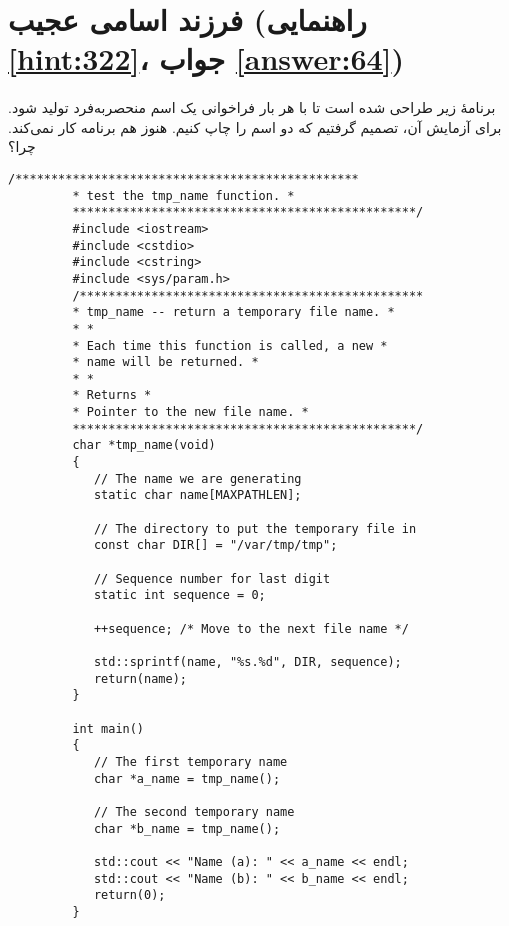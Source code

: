 \section[فرزند اسامی عجیب]{فرزند اسامی عجیب \protect{} (راهنمایی \ref{hint:322}، جواب \ref{answer:64})}
\paragraph{}\label{prog:59}
برنامهٔ زیر طراحی شده است تا با هر بار فراخوانی  یک اسم منحصربه‌فرد تولید شود. برای آزمایش آن، تصمیم گرفتیم که دو اسم را چاپ کنیم. هنوز هم برنامه کار نمی‌کند. چرا؟

\begin{LTR}
    \begin{lstlisting}[style=C++Style]
         /************************************************
         * test the tmp_name function. *
         ************************************************/
         #include <iostream>
         #include <cstdio>
         #include <cstring>
         #include <sys/param.h>
         /************************************************
         * tmp_name -- return a temporary file name. *
         * *
         * Each time this function is called, a new *
         * name will be returned. *
         * *
         * Returns *
         * Pointer to the new file name. *
         ************************************************/
         char *tmp_name(void)
         {
         	// The name we are generating
         	static char name[MAXPATHLEN];

         	// The directory to put the temporary file in
         	const char DIR[] = "/var/tmp/tmp";

         	// Sequence number for last digit
         	static int sequence = 0;

         	++sequence; /* Move to the next file name */

         	std::sprintf(name, "%s.%d", DIR, sequence);
         	return(name);
         }

         int main()
         {
         	// The first temporary name
        	char *a_name = tmp_name();

         	// The second temporary name
         	char *b_name = tmp_name();

         	std::cout << "Name (a): " << a_name << endl;
         	std::cout << "Name (b): " << b_name << endl;
         	return(0);
         }
    \end{lstlisting}
\end{LTR}